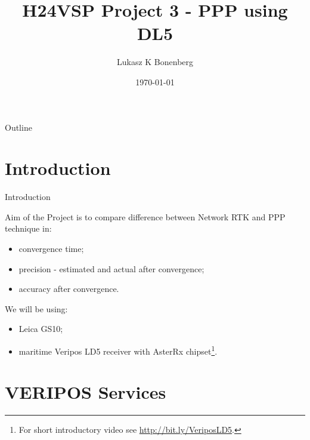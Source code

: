 \documentclass[11pt]{beamer}
\title[EnviroHack]{H24VSP Project 3 - PPP using DL5}
\author{Lukasz K Bonenberg}
\institute{NGI}
\date{\today}
\begin{document}
	

\begin{frame}
	\titlepage
\end{frame}

\begin{frame}{Outline}
	\tableofcontents
\end{frame}


\section{Introduction}

\begin{frame}{Introduction}
	
	Aim of the Project is to compare difference between Network RTK and PPP technique in:
	\begin{itemize}
		\item convergence time;
		\item precision - estimated and actual after convergence; 
		\item accuracy after convergence.
	\end{itemize}
	
	 We will be using:
	 	\begin{itemize}
	 		\item Leica GS10;
	 		\item maritime Veripos LD5 receiver with AsterRx chipset\footnote[frame]{For short introductory video see \url{http://bit.ly/VeriposLD5}.}.
	 	\end{itemize}


\end{frame}


\section{VERIPOS Services}
\end{document}
